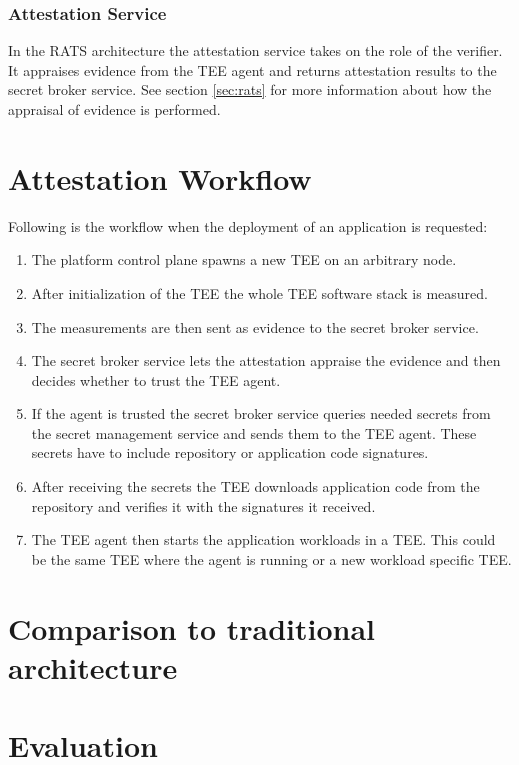 \subsubsection{Attestation Service}

In the RATS architecture the attestation service takes on the role of the
verifier. It appraises evidence from the TEE agent and returns attestation
results to the secret broker service. See section \ref{sec:rats} for more
information about how the appraisal of evidence is performed.

\section{Attestation Workflow}
\label{sec:proposal:attestation-workflow}

Following is the workflow when the deployment of an application is requested:

\begin{enumerate}
  \item The platform control plane spawns a new TEE on an arbitrary node.
  \item After initialization of the TEE the whole TEE software stack is
        measured.
  \item The measurements are then sent as evidence to the secret broker service.
  \item The secret broker service lets the attestation appraise the evidence and
        then decides whether to trust the TEE agent.
  \item If the agent is trusted the secret broker service queries needed secrets
        from the secret management service and sends them to the TEE agent.
        These secrets have to include repository or application code signatures.
  \item After receiving the secrets the TEE downloads application code from the
        repository and verifies it with the signatures it received.
  \item The TEE agent then starts the application workloads in a TEE. This could
        be the same TEE where the agent is running or a new workload specific
        TEE.
\end{enumerate}

\section{Comparison to traditional architecture}


\section{Evaluation}
